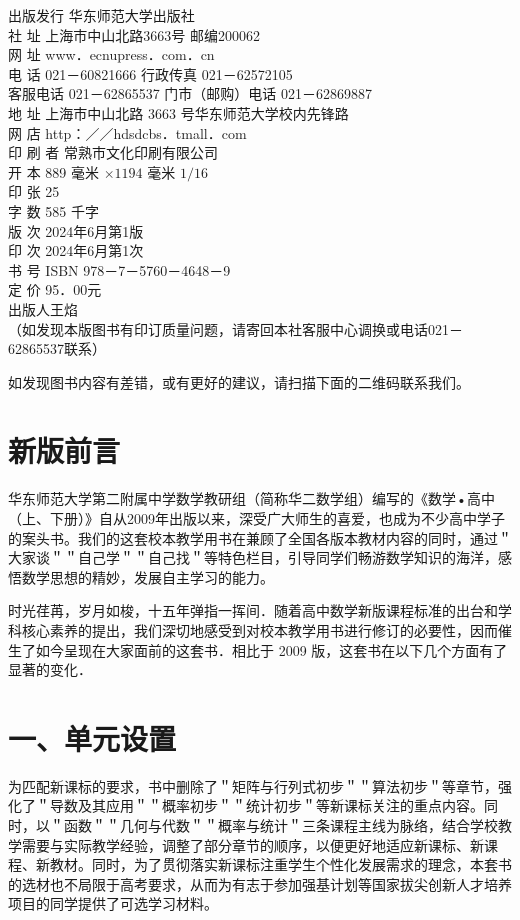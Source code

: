 \documentclass[10pt]{article}
\begin{document}
出版发行 华东师范大学出版社\\
社 址 上海市中山北路3663号 邮编200062\\
网 址 www．ecnupress．com．cn\\
电 话 021－60821666 行政传真 021－62572105\\
客服电话 021－62865537 门市（邮购）电话 021－62869887\\
地 址 上海市中山北路 3663 号华东师范大学校内先锋路\\
网 店 http：／／hdsdcbs．tmall．com\\
印 刷 者 常熟市文化印刷有限公司\\
开 本 889 毫米 \(\times 1194\) 毫米 \(1 / 16\)\\
印 张 25\\
字 数 585 千字\\
版 次 2024年6月第1版\\
印 次 2024年6月第1次\\
书 号 ISBN 978－7－5760－4648－9\\
定 价 95．00元\\
出版人王焰\\
（如发现本版图书有印订质量问题，请寄回本社客服中心调换或电话021－62865537联系）

如发现图书内容有差错，或有更好的建议，请扫描下面的二维码联系我们。

\section*{新版前言}
华东师范大学第二附属中学数学教研组（简称华二数学组）编写的《数学•高中（上、下册）》自从2009年出版以来，深受广大师生的喜爱，也成为不少高中学子的案头书。我们的这套校本教学用书在兼顾了全国各版本教材内容的同时，通过＂大家谈＂＂自己学＂＂自己找＂等特色栏目，引导同学们畅游数学知识的海洋，感悟数学思想的精妙，发展自主学习的能力。

时光荏苒，岁月如梭，十五年弹指一挥间．随着高中数学新版课程标准的出台和学科核心素养的提出，我们深切地感受到对校本教学用书进行修订的必要性，因而催生了如今呈现在大家面前的这套书．相比于 2009 版，这套书在以下几个方面有了显著的变化．

\section*{一、单元设置}
为匹配新课标的要求，书中删除了＂矩阵与行列式初步＂＂算法初步＂等章节，强化了＂导数及其应用＂＂概率初步＂＂统计初步＂等新课标关注的重点内容。同时，以＂函数＂＂几何与代数＂＂概率与统计＂三条课程主线为脉络，结合学校教学需要与实际教学经验，调整了部分章节的顺序，以便更好地适应新课标、新课程、新教材。同时，为了贯彻落实新课标注重学生个性化发展需求的理念，本套书的选材也不局限于高考要求，从而为有志于参加强基计划等国家拔尖创新人才培养项目的同学提供了可选学习材料。
\end{document}
